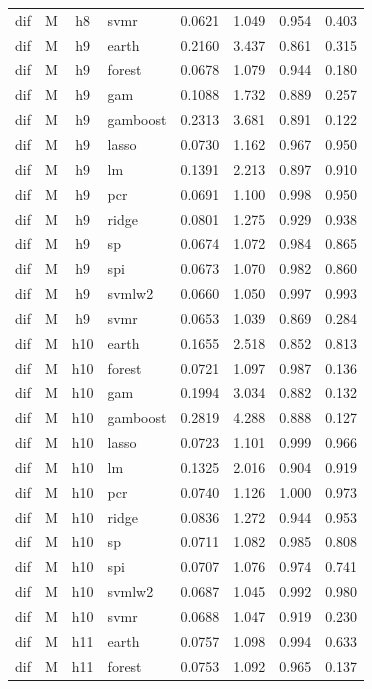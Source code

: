 \begin{ThreePartTable}
\begin{longtable}[t]{llclcccc}
dif & M & h8 & svmr & 0.0621 & 1.049 & 0.954 & 0.403\\
\addlinespace
dif & M & h9 & earth & 0.2160 & 3.437 & 0.861 & 0.315\\
dif & M & h9 & forest & 0.0678 & 1.079 & 0.944 & 0.180\\
dif & M & h9 & gam & 0.1088 & 1.732 & 0.889 & 0.257\\
dif & M & h9 & gamboost & 0.2313 & 3.681 & 0.891 & 0.122\\
dif & M & h9 & lasso & 0.0730 & 1.162 & 0.967 & 0.950\\
dif & M & h9 & lm & 0.1391 & 2.213 & 0.897 & 0.910\\
dif & M & h9 & pcr & 0.0691 & 1.100 & 0.998 & 0.950\\
dif & M & h9 & ridge & 0.0801 & 1.275 & 0.929 & 0.938\\
dif & M & h9 & sp & 0.0674 & 1.072 & 0.984 & 0.865\\
dif & M & h9 & spi & 0.0673 & 1.070 & 0.982 & 0.860\\
dif & M & h9 & svmlw2 & 0.0660 & 1.050 & 0.997 & 0.993\\
dif & M & h9 & svmr & 0.0653 & 1.039 & 0.869 & 0.284\\
\addlinespace
dif & M & h10 & earth & 0.1655 & 2.518 & 0.852 & 0.813\\
dif & M & h10 & forest & 0.0721 & 1.097 & 0.987 & 0.136\\
dif & M & h10 & gam & 0.1994 & 3.034 & 0.882 & 0.132\\
dif & M & h10 & gamboost & 0.2819 & 4.288 & 0.888 & 0.127\\
dif & M & h10 & lasso & 0.0723 & 1.101 & 0.999 & 0.966\\
dif & M & h10 & lm & 0.1325 & 2.016 & 0.904 & 0.919\\
dif & M & h10 & pcr & 0.0740 & 1.126 & 1.000 & 0.973\\
dif & M & h10 & ridge & 0.0836 & 1.272 & 0.944 & 0.953\\
dif & M & h10 & sp & 0.0711 & 1.082 & 0.985 & 0.808\\
dif & M & h10 & spi & 0.0707 & 1.076 & 0.974 & 0.741\\
dif & M & h10 & svmlw2 & 0.0687 & 1.045 & 0.992 & 0.980\\
dif & M & h10 & svmr & 0.0688 & 1.047 & 0.919 & 0.230\\
\addlinespace
dif & M & h11 & earth & 0.0757 & 1.098 & 0.994 & 0.633\\
dif & M & h11 & forest & 0.0753 & 1.092 & 0.965 & 0.137\\

\end{longtable}
\end{ThreePartTable}
